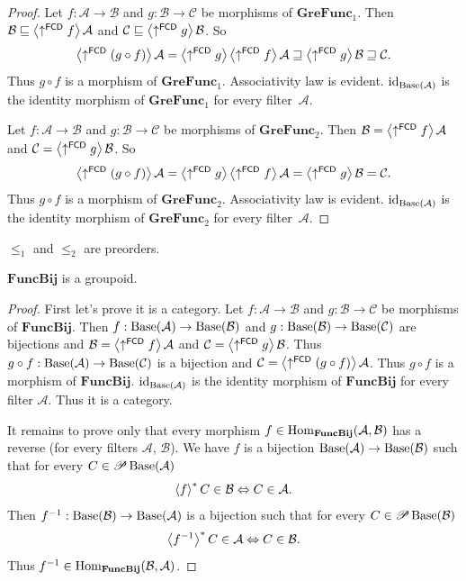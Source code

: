 \begin{proof}
Let $f:\mathcal{A}\rightarrow\mathcal{B}$ and $g:\mathcal{B}\rightarrow\mathcal{C}$
be morphisms of $\mathbf{GreFunc}_{1}$. Then $\mathcal{B}\sqsubseteq\left\langle \uparrow^{\mathsf{FCD}}f\right\rangle\mathcal{A}$
and $\mathcal{C}\sqsubseteq\left\langle \uparrow^{\mathsf{FCD}}g\right\rangle\mathcal{B}$.
So 
\[
\left\langle \uparrow^{\mathsf{FCD}}(g\circ f)\right\rangle\mathcal{A}=\left\langle \uparrow^{\mathsf{FCD}}g\right\rangle\left\langle \uparrow^{\mathsf{FCD}}f\right\rangle\mathcal{A}\sqsupseteq\left\langle \uparrow^{\mathsf{FCD}}g\right\rangle\mathcal{B}\sqsupseteq\mathcal{C}.
\]
Thus $g\circ f$ is a morphism of $\mathbf{GreFunc}_{1}$. Associativity
law is evident. ${\operatorname{id}}_{\operatorname{Base}(\mathcal{A})}$ is the identity morphism
of $\mathbf{GreFunc}_{1}$ for every filter~$\mathcal{A}$.

Let $f:\mathcal{A}\rightarrow\mathcal{B}$ and $g:\mathcal{B}\rightarrow\mathcal{C}$
be morphisms of $\mathbf{GreFunc}_{2}$. Then $\mathcal{B}=\left\langle \uparrow^{\mathsf{FCD}}f\right\rangle\mathcal{A}$
and $\mathcal{C}=\left\langle \uparrow^{\mathsf{FCD}}g\right\rangle\mathcal{B}$. So
\[
\left\langle \uparrow^{\mathsf{FCD}}(g\circ f)\right\rangle\mathcal{A}=\left\langle \uparrow^{\mathsf{FCD}}g\right\rangle\left\langle \uparrow^{\mathsf{FCD}}f\right\rangle\mathcal{A}=\left\langle \uparrow^{\mathsf{FCD}}g\right\rangle\mathcal{B}=\mathcal{C}.
\]
Thus $g\circ f$ is a morphism of $\mathbf{GreFunc}_{2}$. Associativity
law is evident. ${\operatorname{id}}_{\operatorname{Base}(\mathcal{A})}$ is the identity morphism
of $\mathbf{GreFunc}_{2}$ for every filter~$\mathcal{A}$.\end{proof}
\begin{cor}
$\le_{1}$ and $\le_{2}$ are preorders. \end{cor}
\begin{thm}
$\mathbf{FuncBij}$ is a groupoid.\end{thm}
\begin{proof}
First let's prove it is a category. Let $f:\mathcal{A}\rightarrow\mathcal{B}$
and $g:\mathcal{B}\rightarrow\mathcal{C}$ be morphisms of $\mathbf{FuncBij}$.
Then $f:\operatorname{Base}(\mathcal{A})\rightarrow\operatorname{Base}(\mathcal{B})$ and $g:\operatorname{Base}(\mathcal{B})\rightarrow\operatorname{Base}(\mathcal{C})$
are bijections and $\mathcal{B}=\left\langle \uparrow^{\mathsf{FCD}}f\right\rangle\mathcal{A}$
and $\mathcal{C}=\left\langle \uparrow^{\mathsf{FCD}}g\right\rangle\mathcal{B}$. Thus
$g\circ f:\operatorname{Base}(\mathcal{A})\rightarrow\operatorname{Base}(\mathcal{C})$ is a bijection
and $\mathcal{C}=\left\langle \uparrow^{\mathsf{FCD}}(g\circ f)\right\rangle\mathcal{A}$.
Thus $g\circ f$ is a morphism of $\mathbf{FuncBij}$. ${\operatorname{id}}_{\operatorname{Base}(\mathcal{A})}$
is the identity morphism of $\mathbf{FuncBij}$ for every filter $\mathcal{A}$.
Thus it is a category.

It remains to prove only that every morphism $f\in\operatorname{Hom}_{\mathbf{FuncBij}}(\mathcal{A},\mathcal{B})$
has a reverse (for every filters $\mathcal{A}$, $\mathcal{B}$).
We have $f$ is a bijection $\operatorname{Base}(\mathcal{A})\rightarrow\operatorname{Base}(\mathcal{B})$
such that for every $C\in\mathscr{P}\operatorname{Base}(\mathcal{A})$
\[
\left\langle f\right\rangle ^{\ast}C\in\mathcal{B}\Leftrightarrow C\in\mathcal{A}.
\]
Then $f^{-1}:\operatorname{Base}(\mathcal{B})\rightarrow\operatorname{Base}(\mathcal{A})$ is
a bijection such that for every $C\in\mathscr{P}\operatorname{Base}(\mathcal{B})$
\[
\left\langle f^{-1}\right\rangle ^{\ast}C\in\mathcal{A}\Leftrightarrow C\in\mathcal{B}.
\]
 Thus $f^{-1}\in\operatorname{Hom}_{\mathbf{FuncBij}}(\mathcal{B},\mathcal{A})$.\end{proof}
